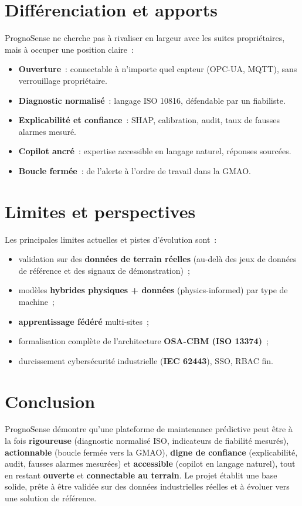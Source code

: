 \documentclass[12pt,a4paper]{article}
\begin{document}
\section{Différenciation et apports}
PrognoSense ne cherche pas à rivaliser en largeur avec les suites propriétaires, mais à
occuper une position claire~:
\begin{itemize}[leftmargin=1.4em]
  \item \textbf{Ouverture}~: connectable à n'importe quel capteur (OPC-UA, MQTT), sans
        verrouillage propriétaire.
  \item \textbf{Diagnostic normalisé}~: langage ISO 10816, défendable par un fiabiliste.
  \item \textbf{Explicabilité et confiance}~: SHAP, calibration, audit, taux de fausses
        alarmes mesuré.
  \item \textbf{Copilot ancré}~: expertise accessible en langage naturel, réponses
        sourcées.
  \item \textbf{Boucle fermée}~: de l'alerte à l'ordre de travail dans la GMAO.
\end{itemize}

\section{Limites et perspectives}
Les principales limites actuelles et pistes d'évolution sont~:
\begin{itemize}[leftmargin=1.4em]
  \item validation sur des \textbf{données de terrain réelles} (au-delà des jeux de
        données de référence et des signaux de démonstration)~;
  \item modèles \textbf{hybrides physiques + données} (physics-informed) par type de
        machine~;
  \item \textbf{apprentissage fédéré} multi-sites~;
  \item formalisation complète de l'architecture \textbf{OSA-CBM (ISO 13374)}~;
  \item durcissement cybersécurité industrielle (\textbf{IEC 62443}), SSO, RBAC fin.
\end{itemize}

\section{Conclusion}
PrognoSense démontre qu'une plateforme de maintenance prédictive peut être à la fois
\textbf{rigoureuse} (diagnostic normalisé ISO, indicateurs de fiabilité mesurés),
\textbf{actionnable} (boucle fermée vers la GMAO), \textbf{digne de confiance}
(explicabilité, audit, fausses alarmes mesurées) et \textbf{accessible} (copilot en
langage naturel), tout en restant \textbf{ouverte} et \textbf{connectable au terrain}.
Le projet établit une base solide, prête à être validée sur des données industrielles
réelles et à évoluer vers une solution de référence.
\end{document}
